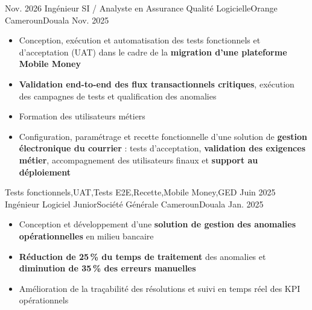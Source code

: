 %
%
%

\begin{experiences}
  \experience
    {Nov. 2026}   {Ingénieur SI / Analyste en Assurance Qualité Logicielle}{Orange Cameroun}{Douala}
    {Nov. 2025} {
                      \begin{itemize}
                        \item Conception, exécution et automatisation des tests fonctionnels et d'acceptation (UAT) dans le cadre de la \textbf{migration d'une plateforme Mobile Money}
                        \item \textbf{Validation end-to-end des flux transactionnels critiques}, exécution des campagnes de tests et qualification des anomalies
                        \item Formation des utilisateurs métiers
                        \item Configuration, paramétrage et recette fonctionnelle d'une solution de \textbf{gestion électronique du courrier} : tests d'acceptation, \textbf{validation des exigences métier}, accompagnement des utilisateurs finaux et \textbf{support au déploiement}
                      \end{itemize}
                    }
                    {Tests fonctionnels,UAT,Tests E2E,Recette,Mobile Money,GED}
  \emptySeparator
  \experience
    {Juin 2025}   {Ingénieur Logiciel Junior}{Société Générale Cameroun}{Douala}
    {Jan. 2025} {
                      \begin{itemize}
                        \item Conception et développement d'une \textbf{solution de gestion des anomalies opérationnelles} en milieu bancaire
                        \item \textbf{Réduction de 25\,\% du temps de traitement} des anomalies et \textbf{diminution de 35\,\% des erreurs manuelles}
                        \item Amélioration de la traçabilité des résolutions et suivi en temps réel des KPI opérationnels
                      \end{itemize}
                    }

\end{experiences}
